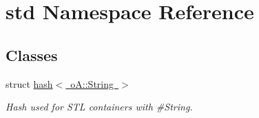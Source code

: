 \hypertarget{namespacestd}{}\section{std Namespace Reference}
\label{namespacestd}
\subsection*{Classes}
\begin{DoxyCompactItemize}
\item 
struct \mbox{\hyperlink{structstd_1_1hash_3_01o_a_1_1_string_01_4}{hash$<$ o\+A\+::\+String $>$}}
\begin{DoxyCompactList}\small\item\em Hash used for S\+TL containers with \#\+String. \end{DoxyCompactList}\end{DoxyCompactItemize}
